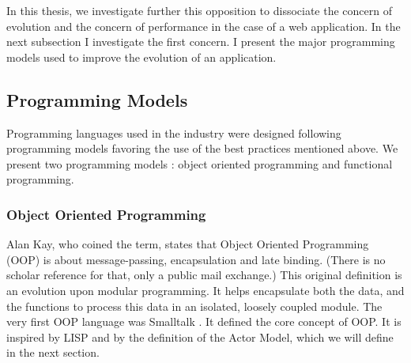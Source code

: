 In this thesis, we investigate further this opposition to dissociate the concern of evolution and the concern of performance in the case of a web application.
In the next subsection I investigate the first concern.
I present the major programming models used to improve the evolution of an application.

\subsection{Programming Models} \label{chapter3:software-design:programming-models}

Programming languages used in the industry were designed following programming models favoring the use of the best practices mentioned above.
We present two programming models : object oriented programming and functional programming.

\subsubsection{Object Oriented Programming}


Alan Kay, who coined the term, states that Object Oriented Programming (OOP) is about message-passing, encapsulation and late binding.
(There is no scholar reference for that, only a public mail exchange.)
This original definition is an evolution upon modular programming.
It helps encapsulate both the data, and the functions to process this data in an isolated, loosely coupled module.
The very first OOP language was Smalltalk \cite{Goldberg1984}.
It defined the core concept of OOP.
It is inspired by LISP and by the definition of the Actor Model, which we will define in the next section.


